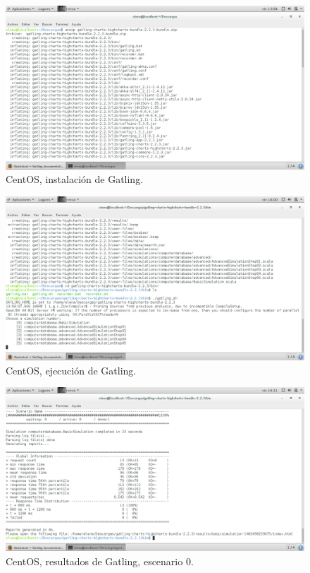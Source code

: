 \begin{figure}[H] 
	\centering
	\includegraphics[width=14.7cm]{./img/opcional1_1.png} 	
	\caption{CentOS, instalación de Gatling.} \label{fig:opcional1_1}
\end{figure}

\begin{figure}[H] 
	\centering
	\includegraphics[width=14.7cm]{./img/opcional1_2.png} 	
	\caption{CentOS, ejecución de Gatling.} \label{fig:opcional1_2}
\end{figure}

\begin{figure}[H] 
	\centering
	\includegraphics[width=14.7cm]{./img/opcional1_3.png} 	
	\caption{CentOS, resultados de Gatling, escenario 0.} \label{fig:opcional1_3}
\end{figure}

